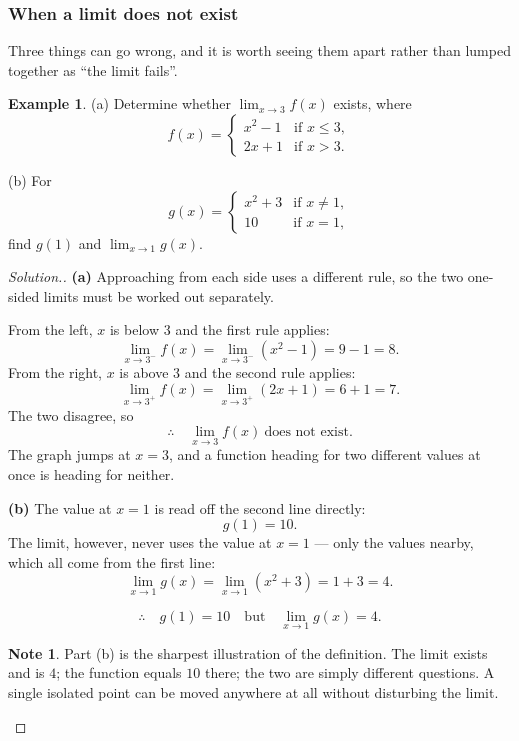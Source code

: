 \documentclass[11pt,a4paper]{article}
\theoremstyle{definition}
\newtheorem{example}[thm]{Example}
\newtheorem{note}[thm]{Note}
\newenvironment{solution}
  {\renewcommand{\qedsymbol}{}\begin{proof}[\textit{Solution}.]}
  {\end{proof}}
\begin{document}
\subsubsection{When a limit does not exist}

Three things can go wrong, and it is worth seeing them apart rather than lumped
together as ``the limit fails''.

\begin{example}
(a) Determine whether $\lim_{x\to 3}f(x)$ exists, where
$$f(x)=\begin{cases} x^2-1 & \text{if } x\leq 3,\\ 2x+1 & \text{if } x>3.\end{cases}$$

(b) For
$$g(x)=\begin{cases} x^2+3 & \text{if } x\neq 1,\\ 10 & \text{if } x=1,\end{cases}$$
find $g(1)$ and $\lim_{x\to 1}g(x)$.
\end{example}

\begin{solution}
\textbf{(a)} Approaching from each side uses a different rule, so the two one-sided
limits must be worked out separately.

From the left, $x$ is below $3$ and the first rule applies:
$$\lim_{x\to 3^-}f(x)=\lim_{x\to 3^-}\left(x^2-1\right)=9-1=8.$$
From the right, $x$ is above $3$ and the second rule applies:
$$\lim_{x\to 3^+}f(x)=\lim_{x\to 3^+}(2x+1)=6+1=7.$$
The two disagree, so
$$\therefore\quad \lim_{x\to 3}f(x)\ \text{does not exist}.$$
The graph jumps at $x=3$, and a function heading for two different values at once is
heading for neither.

\textbf{(b)} The value at $x=1$ is read off the second line directly:
$$g(1)=10.$$
The limit, however, never uses the value at $x=1$ --- only the values nearby, which all
come from the first line:
$$\lim_{x\to 1}g(x)=\lim_{x\to 1}\left(x^2+3\right)=1+3=4.$$

$$\therefore\quad g(1)=10\quad\text{but}\quad \lim_{x\to 1}g(x)=4.$$

\begin{note}
Part (b) is the sharpest illustration of the definition. The limit exists and is $4$;
the function equals $10$ there; the two are simply different questions. A single
isolated point can be moved anywhere at all without disturbing the limit.
\end{note}
\end{solution}
\end{document}
